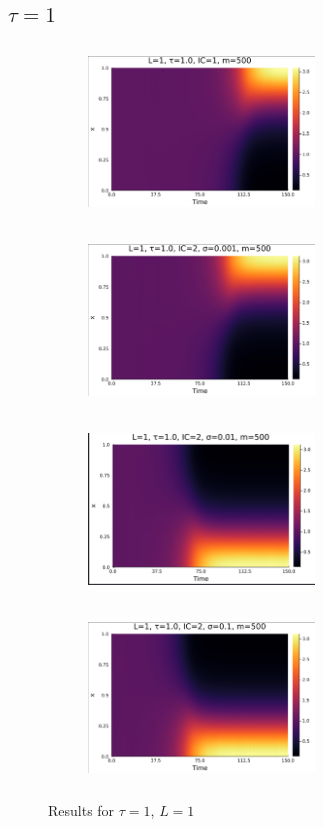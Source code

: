 \documentclass[12pt,a4paper]{article}
\begin{document}
\subsection{$\tau=1$}


\begin{figure}[H]
    \centering
    \begin{subfigure}[b]{0.45\linewidth}
        \centering
        \includegraphics[width=6cm,height = 4.5cm]{l1t1ic1.png}
        \caption{}
        \label{}
    \end{subfigure}
    \hfill
    \begin{subfigure}[b]{0.45\linewidth}
        \centering
        \includegraphics[width=6cm,height = 4.5cm]{l1t1ic2s1e3.png}
        \caption{}
        \label{}
    \end{subfigure}
    \hfill
    \begin{subfigure}[b]{0.45\linewidth}
        \centering
        \includegraphics[width=6cm,height = 4.5cm]{l1t1ic2s1e2.png}
        \caption{}
        \label{}
    \end{subfigure}
    \hfill
    \begin{subfigure}[b]{0.45\linewidth}
        \centering
        \includegraphics[width=6cm,height = 4.5cm]{l1t1ic2s1e1.png}
        \caption{}
        \label{}
    \end{subfigure}
    \caption{Results for $\tau=1$, $L=1$}
    \label{}
\end{figure}
\end{document}
